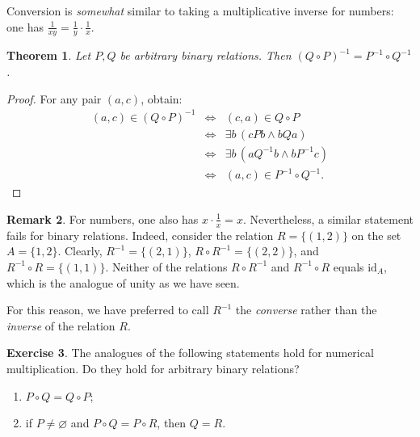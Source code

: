 \documentclass[12pt,notitlepage]{article}
\theoremstyle{plain}
\newtheorem{thm}{Theorem}[section]
\theoremstyle{definition}
\newtheorem{exc}[thm]{Exercise}
\newtheorem{rem}[thm]{Remark}
\theoremstyle{plain}
\newcommand{\void}{\varnothing}
\newcommand{\id}{\mathrm{id}}
\newcommand{\1}{\mathbf{1}}
\newcommand{\0}{\mathbf{0}}
\newcommand{\mcomm}[1]{}
\begin{document}
\noindent Conversion is \emph{somewhat} similar to taking a multiplicative inverse for numbers: one has $\frac{1}{xy} = \frac{1}{y} \cdot \frac{1}{x}$.

\mcomm{The Instructor might wish to compare conversion to matrix transposition or string reversion as well.}
\begin{thm}\label{ch0:comp_inv}
Let $P, Q$ be arbitrary binary relations. Then $(Q \circ P)^{-1} = P^{-1} \circ Q^{-1}$.
\end{thm}
\begin{proof}
For any pair $(a,c)$, obtain:
$$
\begin{array}{rcl}
(a, c) \in (Q \circ P)^{-1} &\iff& (c, a) \in Q \circ P\\
&\iff&\exists b\, (cPb \wedge bQa)\\
&\iff&\exists b\, (a Q^{-1} b \wedge b P^{-1} c)\\
&\iff&(a, c) \in P^{-1} \circ Q^{-1}.
\end{array}
$$
\end{proof}
\begin{rem}
For numbers, one also has $x \cdot \frac{1}{x} = x$. Nevertheless, a similar statement fails for binary relations. Indeed, consider the relation $R = \{ (1, 2) \}$ on the set $A = \{1, 2\}$. Clearly, $R^{-1} = \{ (2,1) \}$, $R \circ R^{-1} = \{ (2,2)\}$, and $R^{-1} \circ R = \{ (1, 1)\}$. Neither of the relations $R \circ R^{-1}$ and $R^{-1} \circ R$ equals $\id_A$, which is the analogue of unity as we have seen.

For this reason, we have preferred to call $R^{-1}$ the \emph{converse} rather than the \emph{inverse} of the relation $R$.
\end{rem}
\begin{exc}
The analogues of the following statements hold for numerical multiplication. Do they hold for arbitrary binary relations?
\begin{enumerate}
\item $P \circ Q = Q \circ P$;
\item if $P \neq \void$ and $P \circ Q = P \circ R$, then $Q = R$.
\end{enumerate}
\end{exc}
\end{document}
